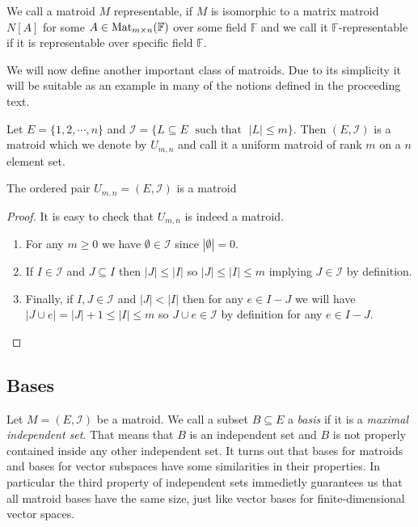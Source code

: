 \begin{defn}
    We call a matroid $M$ representable, if $M$ is isomorphic to a matrix matroid $N[A]$ for some $A \in \operatorname{Mat}_{m \times n}(\mathbb{F})$ over some field $\mathbb{F}$ and we call it $\mathbb{F}$-representable if it is representable over specific field $\mathbb{F}$.
\end{defn}

We will now define another important class of matroids. Due to its simplicity it will be suitable as an example in many of the notions defined in the proceeding text.

\begin{defn}\label{uniformM}
    Let $E = \{1, 2, \cdots, n\}$ and $\mathcal{I} = \{ L \subseteq E \; \text{ such that } \; |L| \leq m\}$. Then $(E, \mathcal{I})$ is a matroid which we denote by $U_{m,n}$ and call it a uniform matroid of rank $m$ on a $n$ element set.
\end{defn}
\begin{theorem}
    The ordered pair $U_{m,n} = (E, \mathcal{I})$ is a matroid
    
\end{theorem}

\begin{proof}
    
It is easy to check that $U_{m,n}$ is indeed a matroid. 


\begin{enumerate}
   

\item For any $m \geq 0$ we have $\emptyset \in \mathcal{I}$ since $|\emptyset | = 0$.

\item If $I \in \mathcal{I}$ and $J \subseteq I$ then $|J|\leq |I|$ so $|J|\leq |I| \leq m$ implying $J \in \mathcal{I}$ by definition.

\item  Finally, if $I, J \in \mathcal{I}$ and $|J|<|I|$ then for any $e \in I - J$ we will have $|J \cup e| = |J| + 1 \leq |I| \leq m$ so $J \cup e \in \mathcal{I}$ by definition for any $e \in I - J.$


\end{enumerate}
\end{proof}

\subsection{Bases}

Let $M = (E, \mathcal{I})$ be a matroid. We call a subset $B \subseteq E$ a \textit{basis} if it is a \textit{maximal independent set}. That means that $B$ is an independent set and $B$ is not properly contained inside any other independent set. It turns out that bases for matroids and bases for vector subspaces have some similarities in their properties. In particular the third property of independent sets immedietly guarantees us that all matroid bases have the same size, just like vector bases for finite-dimensional vector spaces.

